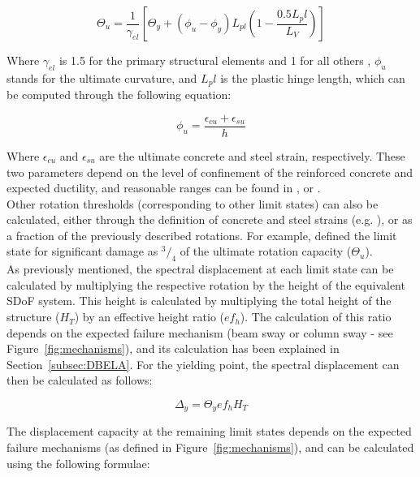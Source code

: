 \begin{equation}
	\Theta_u = \frac{1}{\gamma_{el}}\left[\Theta_y + (\phi_u-\phi_y)L_{pl}\left(1-\frac{0.5L_pl}{L_V}\right)\right]
\end{equation}

Where $\gamma_{el}$ is 1.5 for the primary structural elements and 1 for all others \citep{BorziEtAl2008b}, $\phi_u$ stands for the ultimate curvature, and $L_pl$ is the plastic hinge length, which can be computed through the following equation:

\begin{equation}
	\phi_u = \frac{\epsilon_{cu}+\epsilon_{su}}{h}
\end{equation}

Where $\epsilon_{cu}$ and $\epsilon_{su}$ are the ultimate concrete and steel strain, respectively. These two parameters depend on the level of confinement of the reinforced concrete and expected ductility, and reasonable ranges can be found in \cite{Calvi1999}, \cite{CrowleyEtAl2004} or \cite{BalEtAl2010}.\\

Other rotation thresholds (corresponding to other limit states) can also be calculated, either through the definition of concrete and steel strains (e.g. \cite{CrowleyEtAl2004}), or as a fraction of the previously described rotations. For example, \cite{BorziEtAl2008b} defined the limit state for significant damage as $^3/_4$ of the ultimate rotation capacity ($\Theta_u$).\\

As previously mentioned, the spectral displacement at each limit state can be calculated by multiplying the respective rotation by the height of the equivalent SDoF system. This height is calculated by multiplying the total height of the structure ($H_T$) by an effective height ratio ($ef_h$). The calculation of this ratio depends on the expected failure mechanism (beam sway or column sway - see Figure~\ref{fig:mechanisms}), and its calculation has been explained in Section~\ref{subsec:DBELA}. For the yielding point, the spectral displacement can then be calculated as follows:

\begin{equation}
	\Delta_y = \Theta_yef_hH_T
\end{equation}

The displacement capacity at the remaining limit states depends on the expected failure mechanisms (as defined in Figure~\ref{fig:mechanisms}), and can be calculated using the following formulae:\\

